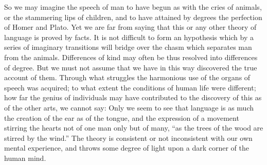 \documentclass[11pt,letter]{article}
\begin{document}
\par  So we may imagine the speech of man to have begun as with the cries of animals, or the stammering lips of children, and to have attained by degrees the perfection of Homer and Plato. Yet we are far from saying that this or any other theory of language is proved by facts. It is not difficult to form an hypothesis which by a series of imaginary transitions will bridge over the chasm which separates man from the animals. Differences of kind may often be thus resolved into differences of degree. But we must not assume that we have in this way discovered the true account of them. Through what struggles the harmonious use of the organs of speech was acquired; to what extent the conditions of human life were different; how far the genius of individuals may have contributed to the discovery of this as of the other arts, we cannot say: Only we seem to see that language is as much the creation of the ear as of the tongue, and the expression of a movement stirring the hearts not of one man only but of many, “as the trees of the wood are stirred by the wind.” The theory is consistent or not inconsistent with our own mental experience, and throws some degree of light upon a dark corner of the human mind.
\end{document}
